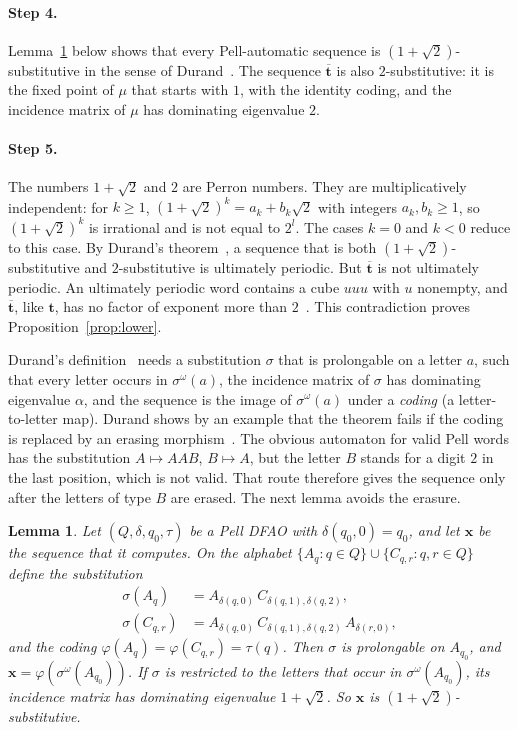 \documentclass[11pt]{article}
\newtheorem{lemma}[theorem]{Lemma}
\theoremstyle{definition}
\theoremstyle{remark}
\newcommand{\tm}{\mathbf{t}}
\begin{document}
\paragraph{Step 4.} Lemma~\ref{lem:subst} below shows that every Pell-automatic sequence is $(1+\sqrt{2})$-substitutive in the sense of Durand~\cite[Definition~2]{Durand}. The sequence $\overline{\tm}$ is also $2$-substitutive: it is the fixed point of $\mu$ that starts with $1$, with the identity coding, and the incidence matrix of $\mu$ has dominating eigenvalue $2$.

\paragraph{Step 5.} The numbers $1+\sqrt{2}$ and $2$ are Perron numbers. They are multiplicatively independent: for $k \ge 1$, $(1+\sqrt{2})^k = a_k + b_k\sqrt{2}$ with integers $a_k, b_k \ge 1$, so $(1+\sqrt{2})^k$ is irrational and is not equal to $2^l$. The cases $k = 0$ and $k < 0$ reduce to this case. By Durand's theorem~\cite[Theorem~1]{Durand}, a sequence that is both $(1+\sqrt{2})$-substitutive and $2$-substitutive is ultimately periodic. But $\overline{\tm}$ is not ultimately periodic. An ultimately periodic word contains a cube $uuu$ with $u$ nonempty, and $\overline{\tm}$, like $\tm$, has no factor of exponent more than $2$~\cite[Section~1]{ARS}. This contradiction proves Proposition~\ref{prop:lower}.

\medskip

Durand's definition~\cite[Definition~2]{Durand} needs a substitution $\sigma$ that is prolongable on a letter $a$, such that every letter occurs in $\sigma^\omega(a)$, the incidence matrix of $\sigma$ has dominating eigenvalue $\alpha$, and the sequence is the image of $\sigma^\omega(a)$ under a \emph{coding} (a letter-to-letter map). Durand shows by an example that the theorem fails if the coding is replaced by an erasing morphism~\cite[after Corollary~6]{Durand}. The obvious automaton for valid Pell words has the substitution $A \mapsto AAB$, $B \mapsto A$, but the letter $B$ stands for a digit $2$ in the last position, which is not valid. That route therefore gives the sequence only after the letters of type $B$ are erased. The next lemma avoids the erasure.

\begin{lemma}\label{lem:subst}
Let $(Q, \delta, q_0, \tau)$ be a Pell DFAO with $\delta(q_0, 0) = q_0$, and let $\mathbf{x}$ be the sequence that it computes. On the alphabet $\{A_q : q \in Q\} \cup \{C_{q,r} : q, r \in Q\}$ define the substitution
\begin{align*}
\sigma(A_q) &= A_{\delta(q,0)}\, C_{\delta(q,1), \delta(q,2)},\\
\sigma(C_{q,r}) &= A_{\delta(q,0)}\, C_{\delta(q,1), \delta(q,2)}\, A_{\delta(r,0)},
\end{align*}
and the coding $\varphi(A_q) = \varphi(C_{q,r}) = \tau(q)$. Then $\sigma$ is prolongable on $A_{q_0}$, and $\mathbf{x} = \varphi(\sigma^\omega(A_{q_0}))$. If $\sigma$ is restricted to the letters that occur in $\sigma^\omega(A_{q_0})$, its incidence matrix has dominating eigenvalue $1 + \sqrt{2}$. So $\mathbf{x}$ is $(1+\sqrt{2})$-substitutive.
\end{lemma}
\end{document}
